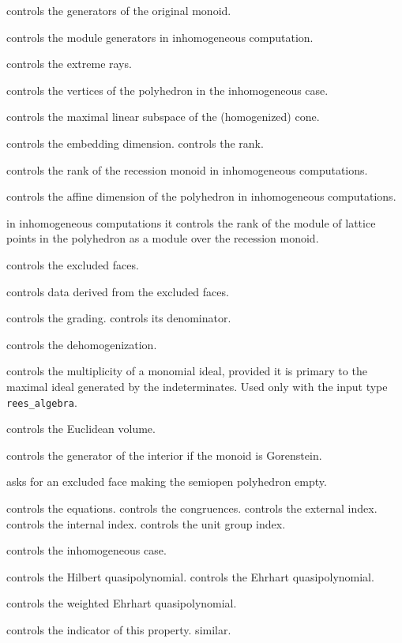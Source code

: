 \begin{itemize}
	
	\itemtt[OriginalMonoidGenerators] controls the generators of the original monoid.
	
	\itemtt[ModuleGenerators] controls the module generators in inhomogeneous computation.
	
	\itemtt[ExtremeRays] controls the extreme rays.
	
	\itemtt[VerticesOfPolyhedron] controls the vertices of the polyhedron in the inhomogeneous case.
	
	\itemtt[MaximalSubspace] controls the maximal linear subspace of the (homogenized) cone.
	
	\itemtt[EmbeddingDim] controls the embedding dimension.
	\itemtt[Rank] controls the rank.
	
	\itemtt[RecessionRank] controls the rank of the recession monoid in inhomogeneous computations.
	
	\itemtt[AffineDim] controls the affine dimension of the polyhedron in inhomogeneous computations.
	
	\itemtt[ModuleRank] in inhomogeneous computations it controls the rank of the module of lattice points in the polyhedron as a module over the recession monoid.
	
	\itemtt[ExcludedFaces] controls the excluded faces.
	
	\itemtt[InclusionExclusionData] controls data derived from the excluded faces.
	
	\itemtt[Grading] controls the grading.
	\itemtt[GradingDenom] controls its denominator.
	
	\itemtt[Dehomogenization] controls the dehomogenization.
	
	\itemtt[ReesPrimaryMultiplicity] controls the multiplicity of a monomial ideal, provided it is primary to the maximal ideal generated by the indeterminates. Used only with the input type \verb|rees_algebra|.
	
	\itemtt[EuclideanVolume]controls the Euclidean volume.
	
	\itemtt[GeneratorOfInterior] controls the generator of the interior if the monoid is Gorenstein.
	
	\itemtt[CoveringFace] asks for an excluded face making the semiopen polyhedron empty.
	
	\itemtt[Equations] controls the equations.
	\itemtt[Congruences] controls the congruences.
	\itemtt[ExternalIndex] controls the external index.
	\itemtt[InternalIndex] controls the internal index.
	\itemtt[UnitGroupIndex] controls the unit group index.	
	
	\itemtt[IsInhomogeneous] controls the inhomogeneous case.
	
	\itemtt[HilbertQuasiPolynomial] controls the Hilbert quasipolynomial.
	\itemtt[EhrhartQuasiPolynomial] controls the Ehrhart quasipolynomial.
	
	\itemtt[WeightedEhrhartQuasiPolynomial] controls the weighted Ehrhart quasipolynomial.
	
	\itemtt[IsTriangulationNested] controls the indicator of this property.
	\itemtt[IsTriangulationPartial] similar.
	
\end{itemize}

